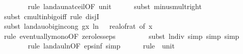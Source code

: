 \begin{isabellebody}
\ \ \ \ \ \ \isamarkupfalse%
\ {\isacharparenleft}{\kern0pt}rule\ landau{\isacharunderscore}{\kern0pt}nat{\isacharunderscore}{\kern0pt}ceil{\isacharbrackleft}{\kern0pt}OF\ unit{\isacharunderscore}{\kern0pt}{}{\isacharbrackright}{\kern0pt}{\isacharparenright}{\kern0pt}\isanewline
\ \ \ \ \isamarkupfalse%
\ {\isacharparenleft}{\kern0pt}subst\ minus{\isacharunderscore}{\kern0pt}mult{\isacharunderscore}{\kern0pt}right{\isacharparenright}{\kern0pt}\isanewline
\ \ \ \ \ \ \isamarkupfalse%
\ {\isacharparenleft}{\kern0pt}subst\ cmult{\isacharunderscore}{\kern0pt}in{\isacharunderscore}{\kern0pt}bigo{\isacharunderscore}{\kern0pt}iff{\isacharcomma}{\kern0pt}\ rule\ disjI{}{\isacharparenright}{\kern0pt}\isanewline
\ \ \ \ \ \ \isamarkupfalse%
\ {\isacharparenleft}{\kern0pt}subst\ landau{\isacharunderscore}{\kern0pt}o{\isachardot}{\kern0pt}big{\isachardot}{\kern0pt}in{\isacharunderscore}{\kern0pt}cong{\isacharbrackleft}{\kern0pt}\ g{\isacharequal}{\kern0pt}{\isachardoublequoteopen}{\isasymlambda}x{\isachardot}{\kern0pt}\ ln{\isacharparenleft}{\kern0pt}\ {}\ {\isacharslash}{\kern0pt}\ {\isacharparenleft}{\kern0pt}real{\isacharunderscore}{\kern0pt}of{\isacharunderscore}{\kern0pt}rat\ {\isacharparenleft}{\kern0pt}{\isasymepsilon}{\isacharunderscore}{\kern0pt}of\ x{\isacharparenright}{\kern0pt}{\isacharparenright}{\kern0pt}{\isacharparenright}{\kern0pt}{\isachardoublequoteclose}{\isacharbrackright}{\kern0pt}{\isacharparenright}{\kern0pt}\isanewline
\ \ \ \ \ \ \ \isamarkupfalse%
\ {\isacharparenleft}{\kern0pt}rule\ eventually{\isacharunderscore}{\kern0pt}mono{\isacharbrackleft}{\kern0pt}OF\ zero{\isacharunderscore}{\kern0pt}less{\isacharunderscore}{\kern0pt}eps{\isacharbrackright}{\kern0pt}{\isacharparenright}{\kern0pt}\isanewline
\ \ \ \ \ \ \ \isamarkupfalse%
\ {\isacharparenleft}{\kern0pt}subst\ ln{\isacharunderscore}{\kern0pt}div{\isacharcomma}{\kern0pt}\ simp{\isacharcomma}{\kern0pt}\ simp{\isacharcomma}{\kern0pt}\ simp{\isacharparenright}{\kern0pt}\isanewline
\ \ \ \ \ \ \isamarkupfalse%
\ {\isacharparenleft}{\kern0pt}rule\ landau{\isacharunderscore}{\kern0pt}ln{\isacharunderscore}{\kern0pt}{}{\isacharbrackleft}{\kern0pt}OF\ eps{\isacharunderscore}{\kern0pt}inf{\isacharbrackright}{\kern0pt}{\isacharcomma}{\kern0pt}\ simp{\isacharparenright}{\kern0pt}\isanewline
\ \ \ \ \isamarkupfalse%
\ {\isacharparenleft}{\kern0pt}rule\ \ unit{\isacharunderscore}{\kern0pt}{}{\isacharparenright}{\kern0pt}\isanewline

\end{isabellebody}
